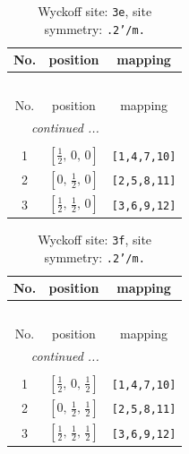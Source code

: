 \documentclass[fleqn,8pt]{jsarticle}
\begin{document}
\begin{longtable}{ccc}
\caption{Wyckoff site: {\tt 3e}, site symmetry: {\tt .2'/m.}}
 \\
 \hline \hline
No. & position & mapping \\ \hline \endfirsthead

\multicolumn{2}{l}{\tablename\ \thetable{}} \\
 \hline \hline
No. & position & mapping \\ \hline \endhead

 \hline \hline
\multicolumn{2}{r}{\footnotesize\it continued ...} \\ \endfoot

 \hline \hline
\multicolumn{2}{r}{} \\ \endlastfoot

1 & $\left[ \frac{1}{2},\, 0,\, 0 \right]$ & {\tt [1,4,7,10]} \\ \hline
2 & $\left[ 0,\, \frac{1}{2},\, 0 \right]$ & {\tt [2,5,8,11]} \\ \hline
3 & $\left[ \frac{1}{2},\, \frac{1}{2},\, 0 \right]$ & {\tt [3,6,9,12]} \\
\end{longtable}
\renewcommand{\arraystretch}{1.2}
\begin{longtable}{ccc}
\caption{Wyckoff site: {\tt 3f}, site symmetry: {\tt .2'/m.}}
 \\
 \hline \hline
No. & position & mapping \\ \hline \endfirsthead

\multicolumn{2}{l}{\tablename\ \thetable{}} \\
 \hline \hline
No. & position & mapping \\ \hline \endhead

 \hline \hline
\multicolumn{2}{r}{\footnotesize\it continued ...} \\ \endfoot

 \hline \hline
\multicolumn{2}{r}{} \\ \endlastfoot

1 & $\left[ \frac{1}{2},\, 0,\, \frac{1}{2} \right]$ & {\tt [1,4,7,10]} \\ \hline
2 & $\left[ 0,\, \frac{1}{2},\, \frac{1}{2} \right]$ & {\tt [2,5,8,11]} \\ \hline
3 & $\left[ \frac{1}{2},\, \frac{1}{2},\, \frac{1}{2} \right]$ & {\tt [3,6,9,12]} \\
\end{longtable}
\renewcommand{\arraystretch}{1.2}
\end{document}
